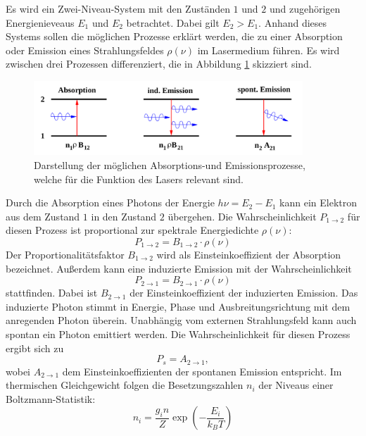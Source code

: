 Es wird ein Zwei-Niveau-System mit den Zuständen ${1}$ und ${2}$ und zugehörigen
Energienieveaus $E_{1}$ und $E_{2}$ betrachtet. Dabei gilt $E_{2}> E_{1}$. Anhand
dieses Systems sollen die möglichen Prozesse erklärt werden, die zu einer Absorption oder
Emission eines Strahlungsfeldes  $\rho(\nu)$ im Lasermedium führen. Es wird zwischen
drei Prozessen differenziert, die in Abbildung \ref{fig:emission} skizziert sind.
\begin{figure}
	  \centering
	  \includegraphics[width = 0.9\textwidth]{pictures/emission.png}
		\caption{Darstellung der möglichen Absorptions-und Emissionsprozesse, welche für die Funktion des Lasers relevant sind.~\cite{Anleitung}}
		\label{fig:emission}
\end{figure}
Durch die Absorption eines Photons der Energie $h \nu = E_{2} - E_{1}$ kann ein Elektron aus dem
Zustand $1$ in den Zustand ${2}$ übergehen. Die Wahrscheinlichkeit $P_{1\rightarrow 2}$ für
diesen Prozess ist proportional zur spektrale Energiedichte $\rho(\nu)$:
\begin{equation}
	  P_{1\rightarrow 2} = B_{1\rightarrow 2}\cdot\rho(\nu)
\end{equation}
Der Proportionalitätsfaktor $B_{1\rightarrow 2}$ wird als Einsteinkoeffizient der Absorption
bezeichnet. Außerdem kann eine induzierte Emission mit der Wahrscheinlichkeit
\begin{equation}
	  P_{2\rightarrow 1} = B_{2\rightarrow 1}\cdot\rho(\nu)
\end{equation}
stattfinden. Dabei ist  $B_{2\rightarrow1}$ der Einsteinkoeffizient der induzierten Emission.
Das induzierte Photon stimmt in Energie, Phase und Ausbreitungsrichtung mit dem anregenden Photon überein.
Unabhängig vom externen Strahlungsfeld kann auch spontan ein Photon emittiert werden. Die
Wahrscheinlichkeit für diesen Prozess ergibt sich zu
\begin{equation}
	  P_{s} = A_{2 \rightarrow 1} ,
\end{equation}
wobei $A_{2 \rightarrow 1}$ dem Einsteinkoeffizienten der spontanen Emission entspricht.
Im thermischen Gleichgewicht folgen die Besetzungszahlen $n_{i}$ der Niveaus einer
Boltzmann-Statistik:
\begin{equation}
	n_{i} = \frac{g_{i}n}{Z}\exp\left(-\frac{E_{i}}{k_{B}T}\right)
\end{equation}
